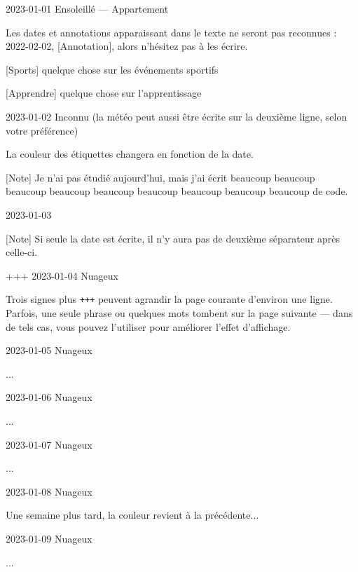 \documentclass[11pt, paperstyle=light yellow, color entry]{jwjournal}
\begin{document}
2023-01-01 Ensoleillé --- Appartement

  Les dates et annotations apparaissant dans le texte ne seront pas reconnues : 2022-02-02, [Annotation], alors n'hésitez pas à les écrire.

  [Sports] quelque chose sur les événements sportifs

  [Apprendre] quelque chose sur l'apprentissage



2023-01-02
Inconnu (la météo peut aussi être écrite sur la deuxième ligne, selon votre préférence)

  La couleur des étiquettes changera en fonction de la date.

  [Note] Je n'ai pas étudié aujourd'hui, mais j'ai écrit beaucoup beaucoup beaucoup beaucoup beaucoup beaucoup beaucoup beaucoup beaucoup de code.



2023-01-03

  [Note] Si seule la date est écrite, il n'y aura pas de deuxième séparateur après celle-ci.


+++
2023-01-04  Nuageux

  Trois signes plus \texttt{+++} peuvent agrandir la page courante d'environ une ligne. Parfois, une seule phrase ou quelques mots tombent sur la page suivante --- dans de tels cas, vous pouvez l'utiliser pour améliorer l'effet d'affichage.



2023-01-05  Nuageux

  ...



2023-01-06  Nuageux

  ...



2023-01-07  Nuageux

  ...



2023-01-08  Nuageux

  Une semaine plus tard, la couleur revient à la précédente...



2023-01-09  Nuageux

  ...
\end{document}
